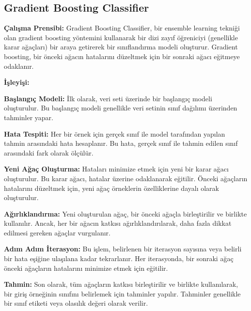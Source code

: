 \documentclass[twocolumn]{article}
\begin{document}
\begin{flushleft}
		\subsection{Gradient Boosting Classifier}
		\begin{description}
			\item \textbf {Çalışma Prensibi:} Gradient Boosting Classifier, bir ensemble learning tekniği olan gradient boosting yöntemini kullanarak bir dizi zayıf öğreniciyi (genellikle karar ağaçları) bir araya getirerek bir sınıflandırma modeli oluşturur. Gradient boosting, bir önceki ağacın hatalarını düzeltmek için bir sonraki ağacı eğitmeye odaklanır.
			
			\item \textbf{İşleyişi:}
			
			
			\item \textbf{Başlangıç Modeli:} İlk olarak, veri seti üzerinde bir başlangıç modeli oluşturulur. Bu başlangıç modeli genellikle veri setinin sınıf dağılımı üzerinden tahminler yapar.
			\item \textbf{Hata Tespiti:} Her bir örnek için gerçek sınıf ile model tarafından yapılan tahmin arasındaki hata hesaplanır. Bu hata, gerçek sınıf ile tahmin edilen sınıf arasındaki fark olarak ölçülür.
			\item \textbf{Yeni Ağaç Oluşturma:} Hataları minimize etmek için yeni bir karar ağacı oluşturulur. Bu karar ağacı, hatalar üzerine odaklanarak eğitilir. Önceki ağaçların hatalarını düzeltmek için, yeni ağaç örneklerin özelliklerine dayalı olarak oluşturulur.
			\item \textbf{Ağırlıklandırma:} Yeni oluşturulan ağaç, bir önceki ağaçla birleştirilir ve birlikte kullanılır. Ancak, her bir ağacın katkısı ağırlıklandırılarak, daha fazla dikkat edilmesi gereken ağaçlar vurgulanır.
			\item \textbf{Adım Adım İterasyon:} Bu işlem, belirlenen bir iterasyon sayısına veya belirli bir hata eşiğine ulaşılana kadar tekrarlanır. Her iterasyonda, bir sonraki ağaç önceki ağaçların hatalarını minimize etmek için eğitilir.
			\item \textbf{Tahmin:} Son olarak, tüm ağaçların katkısı birleştirilir ve birlikte kullanılarak, bir giriş örneğinin sınıfını belirlemek için tahminler yapılır. Tahminler genellikle bir sınıf etiketi veya olasılık değeri olarak verilir.
			
		\end{description}
	\end{flushleft}
	
\end{document}
